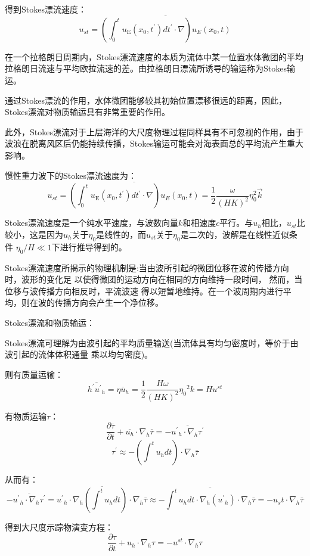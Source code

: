 \documentclass{article}
\begin{document}
得到Stokes漂流速度：
$$u_{st}=\overline{(\int_{0}^{t}{{{u}_{\text{E}}}({{x}_{0}},t^{\prime})}dt^{\prime}\cdot \nabla ){{u}_{E}}({{x}_{0}},t)}$$

在一个拉格朗日周期内，Stokes漂流速度的本质为流体中某一位置水体微团的平均拉格朗日流速与平均欧拉流速的差。由拉格朗日漂流所诱导的输运称为Stokes输运。

通过Stokes漂流的作用，水体微团能够较其初始位置漂移很远的距离，因此，Stokes漂流对物质输运具有非常重要的作用。

此外，Stokes漂流对于上层海洋的大尺度物理过程同样具有不可忽视的作用，由于波浪在脱离风区后仍能持续传播，Stokes输运可能会对海表面总的平均流产生重大影响。

惯性重力波下的Stokes漂流速度为：
$$u_{st}=\overline{(\int_{0}^{t}{{{u}_{\text{E}}}({{x}_{0}},t^{\prime})}dt^{\prime}\cdot \nabla ){{u}_{E}}({{x}_{0}},t)} = \frac{1}{2}\frac{\omega}{(HK)^2}\eta_0^2\vec{k}$$

Stokes漂流速度是一个纯水平速度，与波数向量$k$和相速度$c$平行。与$u_h$相比，$u_{st}$比较小，这是因为$u_h$关于$\eta_0$是线性的，而$u_{st}$关于$\eta_0$是二次的，波解是在线性近似条件 $\eta_0/H \ll 1$下进行推导得到的。

Stokes漂流速度所揭示的物理机制是:当由波所引起的微团位移在波的传播方向时，波形的变化足
以使得微团的运动方向在相同的方向维持一段时间， 然而，当位移与波传播方向相反时，平流波速
得以短暂地维持。在一个波周期内进行平均，则在波的传播方向会产生一个净位移。

Stokes漂流和物质输运：

Stokes漂流可理解为由波引起的平均质量输送(当流体具有均匀密度时，等价于由波引起的流体体积通量 乘以均匀密度)。

则有质量运输：
$$\overline{h^{\prime}{{{{u}^{\prime}}}_{h}}}=\overline{\eta{{{u}}_{h}}}=\frac{1}{2}\frac{H\omega }{{{(HK)}^{2}}}{{\eta }_{0}}^{2}k=H{{u}^{st}}$$

有物质运输$\tau$：
$$\frac{\partial \overline{\tau }}{\partial t}+\overline{{{u}_{h}}}\cdot {{\nabla }_{h}}\overline{\tau }=-\overline{{{{{u}^{\prime}}}_{h}}\cdot {{\nabla }_{h}}\tau ^{\prime}}$$
$$\tau^{\prime}\approx-(\int^tu_hdt)\cdot{\nabla }_{h}\bar{\tau} $$

从而有：
$$-\overline{{{{{u}^{\prime}}}_{h}}\cdot {{\nabla }_{h}}\tau ^{\prime}} 
= \overline{{{{{u}^{\prime}}}_{h}}\cdot {{\nabla }_{h}}(\int^tu_hdt)\cdot{\nabla }_{h}\bar{\tau}}
\approx-\overline{\int^tu_hdt\cdot {{\nabla }_{h}}({{{{u}^{\prime}}}_{h}})\cdot{\nabla }_{h}\bar{\tau}}
=-u_st\cdot {{\nabla }_{h}}\bar{\tau}$$

得到大尺度示踪物演变方程：
$$\frac{\partial \tau }{\partial t}+{{u}_{h}}\cdot {{\nabla }_{h}}\tau =-{{u}^{st}}\cdot {{\nabla }_{h}}\tau$$
\end{document}
